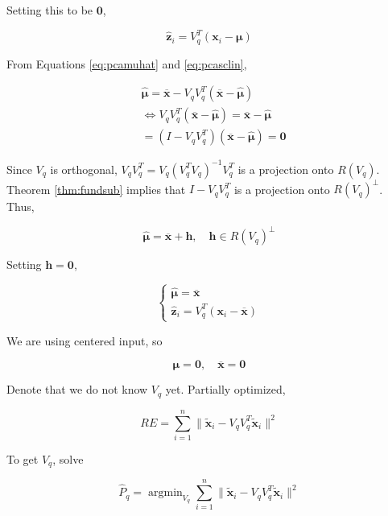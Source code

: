 \documentclass[]{book}
\DeclareMathOperator*{\argmin}{argmin}
\theoremstyle{definition}
\theoremstyle{definition}
\theoremstyle{definition}
\theoremstyle{remark}
\begin{document}
Setting this to be \(\mathbf{0}\),

\begin{equation}
  \hat{\mathbf{z}}_i = V_q^T (\mathbf{x}_i - \boldsymbol\mu)
  \label{eq:pcasclin}
\end{equation}

From Equations \eqref{eq:pcamuhat} and \eqref{eq:pcasclin},

\begin{equation*}
  \begin{split}
    & \hat{\boldsymbol\mu} = \overline{\mathbf{x}} - V_q V_q^T (\overline{\mathbf{x}} - \hat{\boldsymbol\mu}) \\
    & \Leftrightarrow V_q V_q^T (\overline{\mathbf{x}} - \hat{\boldsymbol\mu}) = \overline{\mathbf{x}} - \hat{\boldsymbol\mu} \\
    & = (I - V_q V_q^T) (\overline{\mathbf{x}} - \hat{\boldsymbol\mu}) = \mathbf{0}
  \end{split}
\end{equation*}

Since \(V_q\) is orthogonal, \(V_q V_q^T = V_q (V_q^T V_q)^{-1} V_q^T\) is a projection onto \(R(V_q)\). Theorem \ref{thm:fundsub} implies that \(I - V_q V_q^T\) is a projection onto \(R(V_q)^{\perp}\). Thus,

\[\hat{\boldsymbol\mu} = \overline{\mathbf{x}} + \mathbf{h}, \quad \mathbf{h} \in R(V_q)^{\perp}\]

Setting \(\mathbf{h} = \mathbf{0}\),

\begin{equation}
  \begin{cases}
    \hat{\boldsymbol\mu} = \overline{\mathbf{x}} \\
    \hat{\mathbf{z}}_i = V_q^T (\mathbf{x}_i - \overline{\mathbf{x}})
  \end{cases}
  \label{eq:pcamuaz}
\end{equation}

We are using centered input, so

\[\boldsymbol\mu = \mathbf{0}, \quad \overline{\mathbf{x}} = \mathbf{0}\]

Denote that we do not know \(V_q\) yet. Partially optimized,

\[RE = \sum_{i = 1}^n \lVert \widetilde{\mathbf{x}}_i - V_q V_q^T \widetilde{\mathbf{x}}_i \rVert^2\]

To get \(V_q\), solve

\begin{equation}
  \hat{P}_q = \argmin_{V_q} \sum_{i = 1}^n \lVert \widetilde{\mathbf{x}}_i - V_q V_q^T \widetilde{\mathbf{x}}_i \rVert^2
  \label{eq:pcapq}
\end{equation}
\end{document}
